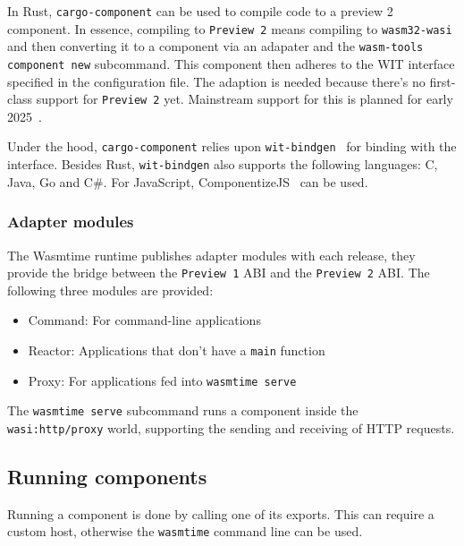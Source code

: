 In Rust, \texttt{cargo-component} can be used to compile code to a preview 2 component. In essence, compiling to \texttt{Preview 2} means compiling to \texttt{wasm32-wasi} and then converting it to a component via an adapater and the \texttt{wasm-tools component new} subcommand. This component then adheres to the \gls{WIT} interface specified in the configuration file. The adaption is needed because there's no first-class support for \texttt{Preview 2} yet. Mainstream support for this is planned for early 2025~\cite{rust:p2}.

Under the hood, \texttt{cargo-component} relies upon \texttt{wit-bindgen}~\cite{gh:wit-bindgen} for binding with the interface. Besides Rust, \texttt{wit-bindgen} also supports the following languages: C, Java, Go and C\#. For JavaScript, ComponentizeJS~\cite{gh:cjs} can be used.

\newpage

\subsubsection{Adapter modules}

The Wasmtime runtime publishes adapter modules with each release, they provide the bridge between the \texttt{Preview 1} \gls{ABI} and the \texttt{Preview 2} \gls{ABI}. The following three modules are provided:

\begin{itemize}
    \item Command: For command-line applications
    \item Reactor: Applications that don't have a \texttt{main} function
    \item Proxy: For applications fed into \texttt{wasmtime serve}
\end{itemize}

The \texttt{wasmtime serve} subcommand runs a component inside the \texttt{wasi:http/proxy} world, supporting the sending and receiving of HTTP requests.

\subsection{Running components}
\label{sec:host}

Running a component is done by calling one of its exports. This can require a custom host, otherwise the \texttt{wasmtime} command line can be used.

